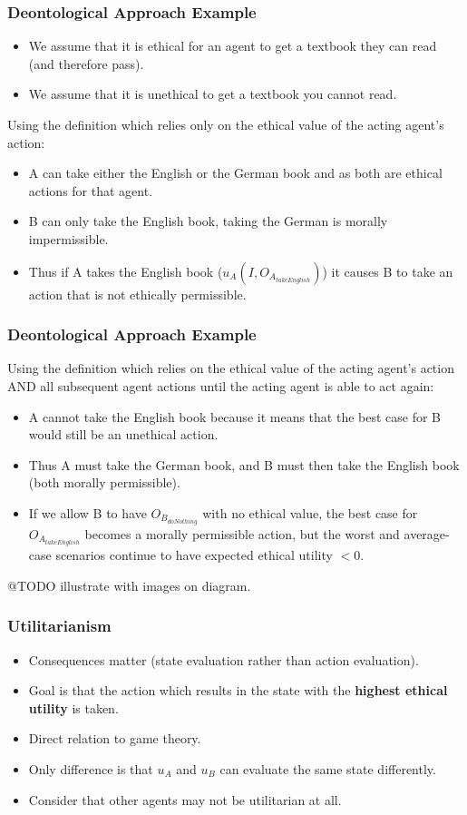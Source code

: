 \documentclass{beamer}
\begin{document}
 
\begin{frame}
\frametitle{Deontological Approach Example}
\begin{itemize}
\item We assume that it is ethical for an agent to get a textbook they can read (and therefore pass).
\item We assume that it is unethical to get a textbook you cannot read.
\end{itemize}

Using the definition which relies only on the ethical value of the acting agent's action:
\begin{itemize}
\item A can take either the English or the German book and as both are ethical actions for that agent.
\item B can only take the English book, taking the German is morally impermissible.
\item Thus if A takes the English book ($u_A(I,O_{A_{takeEnglish}})$) it causes B to take an action that is not ethically permissible.
\end{itemize}
\end{frame} 
 
 \begin{frame}
\frametitle{Deontological Approach Example}
Using the definition which relies on the ethical value of the acting agent's action AND all subsequent agent actions until the acting agent is able to act again:
\begin{itemize}
\item A cannot take the English book because it means that the best case for B would still be an unethical action.
\item Thus A must take the German book, and B must then take the English book (both morally permissible).
\item If we allow B to have $O_{B_{doNothing}}$ with no ethical value, the best case for $O_{A_{takeEnglish}}$ becomes a morally permissible action, but the worst and average-case scenarios continue to have expected ethical utility $<0$.
\end{itemize}
@TODO illustrate with images on diagram.
\end{frame} 


 \begin{frame}
\frametitle{Utilitarianism}
\begin{itemize}
\item Consequences matter (state evaluation rather than action evaluation).
\item Goal is that the action which results in the state with the \textbf{highest ethical utility} is taken.
\item Direct relation to game theory.
\item Only difference is that $u_A$ and $u_B$ can evaluate the same state differently.
\item Consider that other agents may not be utilitarian at all.
\end{itemize}
 \end{frame} 
\end{document}
